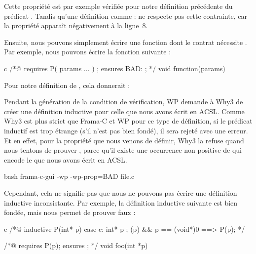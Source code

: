 Cette propriété est par exemple vérifiée pour notre définition précédente du
prédicat . Tandis qu'une définition comme :
ne respecte pas cette contrainte, car la propriété 
apparaît négativement à la ligne~8.


Ensuite, nous pouvons simplement écrire une fonction dont le contrat nécessite
. Par exemple, nous pouvons écrire la fonction suivante :



\begin{CodeBlock}{c}
/*@
  requires P( params ... ) ;
  ensures  BAD: \false ;
*/ void function(params){

}
\end{CodeBlock}


Pour notre définition de , cela donnerait :




Pendant la génération de la condition de vérification, WP demande à Why3 de
créer une définition inductive pour celle que nous avons écrit en ACSL.
Comme Why3 est plus strict que Frama-C et WP pour ce type de définition,
si le prédicat inductif est trop étrange (s'il n'est pas bien fondé), il
sera rejeté avec une erreur. Et en effet, pour la propriété
 que nous venons de définir, Why3 la refuse quand
nous tentons de prouver , parce
qu'il existe une occurrence non positive de 
qui encode le  que nous avons écrit en ACSL.

\begin{CodeBlock}{bash}
frama-c-gui -wp -wp-prop=BAD file.c
\end{CodeBlock}




Cependant, cela ne signifie pas que nous ne pouvons pas écrire une définition
inductive inconsistante. Par exemple, la définition inductive suivante est bien
fondée, mais nous permet de prouver faux :


\begin{CodeBlock}{c}
/*@ inductive P(int* p){
      case c: \forall int* p ; \valid(p) && p == (void*)0 ==> P(p);
    }
*/

/*@ requires P(p);
    ensures \false ; */
void foo(int *p){}
\end{CodeBlock}


